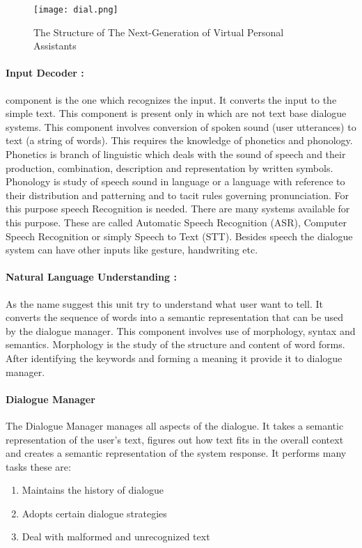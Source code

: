 \documentclass[12pt,a4paper]{article}
\begin{document}
\begin{figure}[t]
	\centering
	\texttt{[image: dial.png]}
	\caption{The Structure of The Next-Generation of Virtual Personal Assistants}
\end{figure}

\paragraph{Input Decoder :}
component is the one which
recognizes the input. It converts the input to the
simple text. This component is present only in which
are not text base dialogue systems. This component
involves conversion of spoken sound (user
utterances) to text (a string of words). This requires
the knowledge of phonetics and phonology.
Phonetics is branch of linguistic which deals with the
sound of speech and their production, combination,
description and representation by written symbols.
Phonology is study of speech sound in language or a
language with reference to their distribution and
patterning and to tacit rules governing pronunciation.
For this purpose speech Recognition is needed.
There are many systems available for this purpose.
These are called Automatic Speech Recognition
(ASR), Computer Speech Recognition or simply
Speech to Text (STT). Besides speech the dialogue
system can have other inputs like gesture,
handwriting etc.

\paragraph{Natural Language Understanding :}
As the name suggest this unit try to
understand what user want to tell. It converts the
sequence of words into a semantic representation that
can be used by the dialogue manager. This
component involves use of morphology, syntax and
semantics. Morphology is the study of the structure
and content of word forms. After identifying the
keywords and forming a meaning it provide it to
dialogue manager.
\newpage
\paragraph{Dialogue Manager}
The Dialogue Manager manages all aspects
of the dialogue. It takes a semantic representation of
the user’s text, figures out how text fits in the overall
context and creates a semantic representation of the
system response. It performs many tasks these are:
\begin{enumerate}
\item Maintains the history of dialogue
\item Adopts certain dialogue strategies
\item Deal with malformed and unrecognized text
\end{enumerate}
\end{document}
